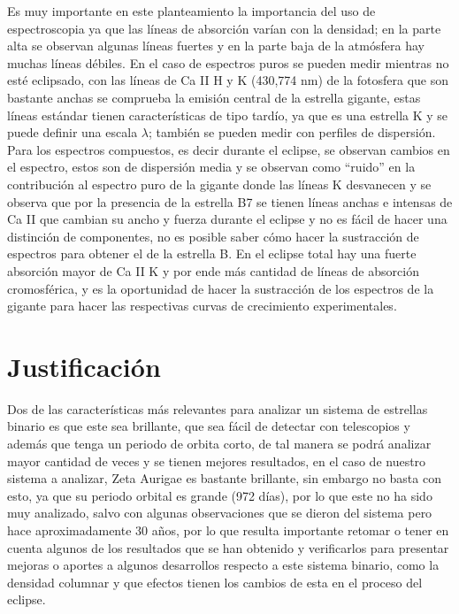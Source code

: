 \documentclass[11pt]{article}
\begin{document}
\noindent Es muy importante en este planteamiento la importancia del uso de espectroscopia ya que las líneas de absorción varían con la densidad; en la parte alta se observan algunas líneas fuertes y en la parte baja de la atmósfera hay muchas líneas débiles. En el caso de espectros puros se pueden medir mientras no esté eclipsado, con las líneas de Ca II H y K (430,774 nm) de la fotosfera que son bastante anchas se comprueba la emisión central de la estrella gigante, estas líneas estándar tienen características de tipo tardío, ya que es una estrella K y se puede definir una escala $\lambda$; también se pueden medir con perfiles de dispersión. Para los espectros compuestos, es decir durante el eclipse, se observan cambios en el espectro, estos son de dispersión media y se observan como ``ruido'' en la contribución al espectro puro de la gigante donde las líneas K desvanecen y se observa que por la presencia de la estrella B7 se tienen líneas anchas e intensas de Ca II que cambian su ancho y fuerza durante el eclipse y no es fácil de hacer una distinción de componentes, no es posible saber cómo hacer la sustracción de espectros para obtener el de la estrella B. En el eclipse total hay una fuerte absorción mayor de Ca II K y por ende más cantidad de líneas de absorción cromosférica, y es la oportunidad de hacer la sustracción de los espectros de la gigante para hacer las respectivas curvas de crecimiento experimentales. 




\section{Justificación}

\vspace{3mm}
Dos de las características más relevantes para analizar un sistema de estrellas binario es que este sea brillante, que sea fácil de detectar con telescopios y además que tenga un periodo de orbita corto, de tal manera se podrá analizar mayor cantidad de veces y se tienen mejores resultados, en el caso de nuestro sistema a analizar, Zeta Aurigae es bastante brillante, sin embargo no basta con esto, ya que su periodo orbital es grande (972 días), por lo que este no ha sido muy analizado, salvo con algunas observaciones que se dieron del sistema pero hace aproximadamente 30 años, por lo que resulta importante retomar o tener en cuenta algunos de los resultados que se han obtenido y verificarlos para presentar mejoras o aportes a algunos desarrollos respecto a este sistema binario, como la densidad columnar y que efectos tienen los cambios de esta en el proceso del eclipse.
\end{document}
